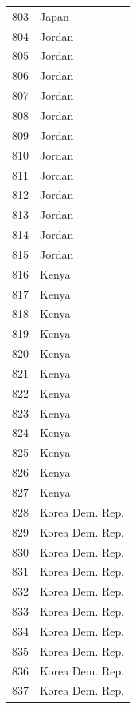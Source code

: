 \documentclass[
  letterpaper,
  DIV=11,
  numbers=noendperiod]{scrreprt}
\begin{document}
\begin{tabular}{ll}
803  &                     Japan \\
804  &                    Jordan \\
805  &                    Jordan \\
806  &                    Jordan \\
807  &                    Jordan \\
808  &                    Jordan \\
809  &                    Jordan \\
810  &                    Jordan \\
811  &                    Jordan \\
812  &                    Jordan \\
813  &                    Jordan \\
814  &                    Jordan \\
815  &                    Jordan \\
816  &                     Kenya \\
817  &                     Kenya \\
818  &                     Kenya \\
819  &                     Kenya \\
820  &                     Kenya \\
821  &                     Kenya \\
822  &                     Kenya \\
823  &                     Kenya \\
824  &                     Kenya \\
825  &                     Kenya \\
826  &                     Kenya \\
827  &                     Kenya \\
828  &           Korea Dem. Rep. \\
829  &           Korea Dem. Rep. \\
830  &           Korea Dem. Rep. \\
831  &           Korea Dem. Rep. \\
832  &           Korea Dem. Rep. \\
833  &           Korea Dem. Rep. \\
834  &           Korea Dem. Rep. \\
835  &           Korea Dem. Rep. \\
836  &           Korea Dem. Rep. \\
837  &           Korea Dem. Rep. \\

\end{tabular}
\end{document}
